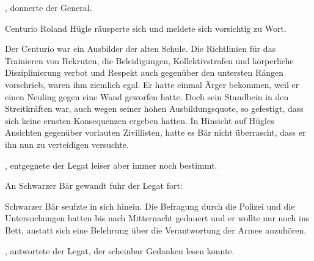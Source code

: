 \par

, donnerte der General. 

\par

Centurio Roland Hügle räusperte sich und meldete sich vorsichtig zu Wort. 

\par

Der Centurio war ein Ausbilder der alten Schule. Die Richtlinien für das Trainieren von Rekruten, die Beleidigungen, Kollektivstrafen und körperliche Disziplinierung verbot und Respekt auch gegenüber den untersten Rängen vorschrieb, waren ihm ziemlich egal. Er hatte einmal Ärger bekommen, weil er einen Neuling gegen eine Wand geworfen hatte. Doch sein Standbein in den Streitkräften war, auch wegen seiner hohen Ausbildungsquote, so gefestigt, dass sich keine ernsten Konsequenzen ergeben hatten. In Hinsicht auf Hügles Ansichten gegenüber vorlauten Zivillisten, hatte es Bär nicht überrascht, dass er ihn nun zu verteidigen versuchte.

\par

, entgegnete der Legat leiser aber immer noch bestimmt. 

\par

An Schwarzer Bär gewandt fuhr der Legat fort: 

\par

Schwarzer Bär seufzte in sich hinein. Die Befragung durch die Polizei und die Untersuchungen hatten bis nach Mitternacht gedauert und er wollte nur noch ins Bett, anstatt sich eine Belehrung über die Verantwortung der Armee anzuhören.

\par

, antwortete der Legat, der scheinbar Gedanken lesen konnte. 

